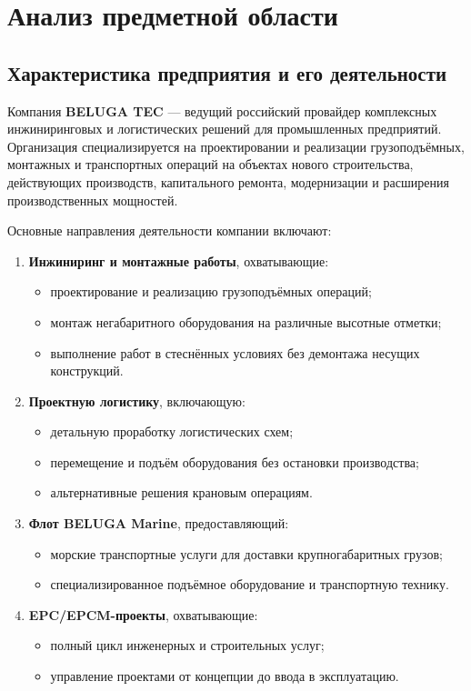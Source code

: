 \section{Анализ предметной области}
\subsection{Характеристика предприятия и его деятельности}

Компания \textbf{BELUGA TEC} — ведущий российский провайдер комплексных инжиниринговых и логистических решений для промышленных предприятий. Организация специализируется на проектировании и реализации грузоподъёмных, монтажных и транспортных операций на объектах нового строительства, действующих производств, капитального ремонта, модернизации и расширения производственных мощностей.

Основные направления деятельности компании включают:

\begin{enumerate}
  \item \textbf{Инжиниринг и монтажные работы}, охватывающие:
  \begin{itemize}
    \item проектирование и реализацию грузоподъёмных операций;
    \item монтаж негабаритного оборудования на различные высотные отметки;
    \item выполнение работ в стеснённых условиях без демонтажа несущих конструкций.
  \end{itemize}

  \item \textbf{Проектную логистику}, включающую:
  \begin{itemize}
    \item детальную проработку логистических схем;
    \item перемещение и подъём оборудования без остановки производства;
    \item альтернативные решения крановым операциям.
  \end{itemize}

  \item \textbf{Флот BELUGA Marine}, предоставляющий:
  \begin{itemize}
    \item морские транспортные услуги для доставки крупногабаритных грузов;
    \item специализированное подъёмное оборудование и транспортную технику.
  \end{itemize}

  \item \textbf{EPC/EPCM-проекты}, охватывающие:
  \begin{itemize}
    \item полный цикл инженерных и строительных услуг;
    \item управление проектами от концепции до ввода в эксплуатацию.
  \end{itemize}
\end{enumerate}

